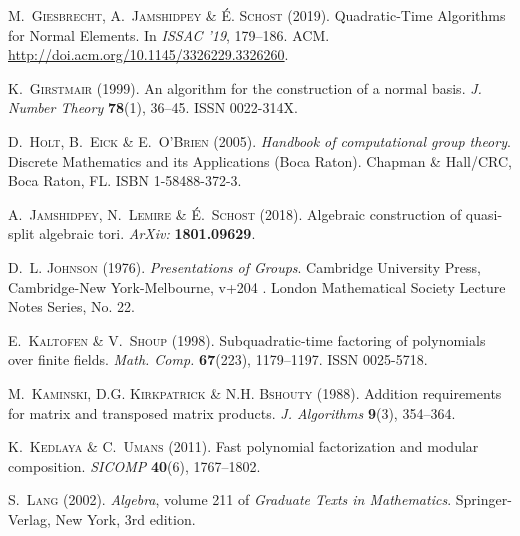 \begin{thebibliography}{36}
\textsc{M.~Giesbrecht}, \textsc{A.~Jamshidpey} \& \textsc{\'{E}. Schost}
  (2019).
\newblock Quadratic-Time Algorithms for Normal Elements.
\newblock In \emph{ISSAC '19}, 179--186. ACM.
\newblock \urlprefix\url{http://doi.acm.org/10.1145/3326229.3326260}.

\textsc{K.~Girstmair} (1999).
\newblock An algorithm for the construction of a normal basis.
\newblock \emph{J. Number Theory} \textbf{78}(1), 36--45.
\newblock ISSN 0022-314X.

\textsc{D.~Holt}, \textsc{B.~Eick} \& \textsc{E.~O'Brien} (2005).
\newblock \emph{Handbook of computational group theory}.
\newblock Discrete Mathematics and its Applications (Boca Raton). Chapman \&
  Hall/CRC, Boca Raton, FL.
\newblock ISBN 1-58488-372-3.

\textsc{A.~Jamshidpey}, \textsc{N.~Lemire} \& \textsc{{\'E.}~Schost} (2018).
\newblock Algebraic construction of quasi-split algebraic tori.
\newblock \emph{ArXiv:} \textbf{1801.09629}.

\textsc{D.~L. Johnson} (1976).
\newblock \emph{Presentations of Groups}.
\newblock Cambridge University Press, Cambridge-New York-Melbourne, v+204 .
\newblock London Mathematical Society Lecture Notes Series, No. 22.

\textsc{E.~Kaltofen} \& \textsc{V.~Shoup} (1998).
\newblock Subquadratic-time factoring of polynomials over finite fields.
\newblock \emph{Math. Comp.} \textbf{67}(223), 1179--1197.
\newblock ISSN 0025-5718.

\textsc{M.~Kaminski}, \textsc{D.G. Kirkpatrick} \& \textsc{N.H. Bshouty}
  (1988).
\newblock Addition requirements for matrix and transposed matrix products.
\newblock \emph{J. Algorithms} \textbf{9}(3), 354--364.

\textsc{K.~Kedlaya} \& \textsc{C.~Umans} (2011).
\newblock Fast polynomial factorization and modular composition.
\newblock \emph{SICOMP} \textbf{40}(6), 1767--1802.

\textsc{S.~Lang} (2002).
\newblock \emph{Algebra}, volume 211 of \emph{Graduate Texts in Mathematics}.
\newblock Springer-Verlag, New York, 3rd edition.


\end{thebibliography}
